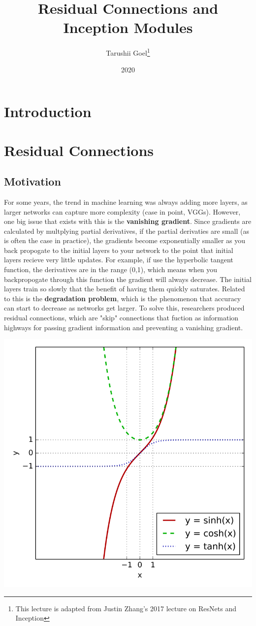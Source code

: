 \documentclass{article}
\title{Residual Connections and Inception Modules}
\author{Tarushii Goel\footnote{This lecture is adapted from Justin Zhang's 2017 lecture on ResNets and Inception}}
\date{2020}
\begin{document}
\maketitle

\section{Introduction}


\section{Residual Connections}
\subsection{Motivation}
For some years, the trend in machine learning was always adding more layers, as larger networks can capture more complexity (case in point, VGGs). However, one big issue that exists with this is the {\bf vanishing gradient}. Since gradients are calculated by multplying partial derivatives, if the partial derivaties are small (as is often the case in practice), the gradients become exponentially smaller as you back propogate to the initial layers to your network to the point that initial layers recieve very little updates. For example, if use the hyperbolic tangent function, the derivatives are in the range (0,1), which means when you backpropogate through this function the gradient will always decrease. The initial layers train so slowly that the benefit of having them quickly saturates. Related to this is the {\bf degradation problem}, which is the phenomenon that accuracy can start to decrease as networks get larger. To solve this, researchers produced residual connections, which are "skip" connections that fuction as information highways for passing gradient information and preventing a vanishing gradient. 
\begin{center}
\includegraphics[scale=0.2]{tanh.png}
\end{center}
\end{document}
